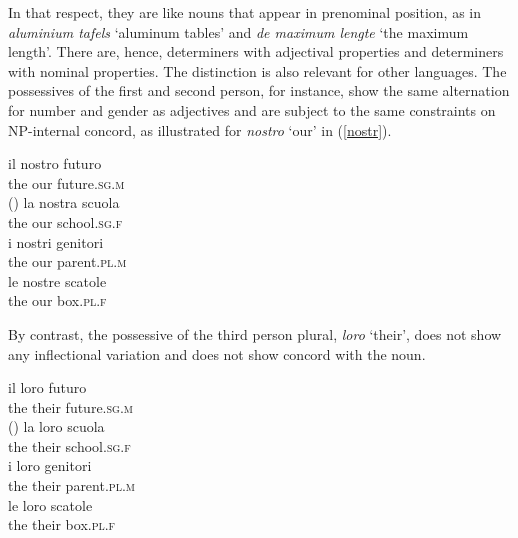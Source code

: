 \documentclass[output=paper,biblatex,babelshorthands,newtxmath,draftmode,colorlinks,citecolor=brown]{langscibook}
\begin{document}
\noindent
In that respect, they are like nouns that appear in prenominal position,
as in \emph{aluminium tafels} `aluminum tables' and \emph{de maximum lengte}
`the maximum length'. There are, hence, determiners with adjectival 
properties and determiners with nominal properties.   
The distinction is also relevant for other languages. The  
possessives of the first and second person, for instance, 
show the same alternation for number and gender as adjectives
and are subject to the same constraints on NP-internal concord, as illustrated 
for \emph{nostro} `our' in (\ref{nostr}). 

\begin{exe}  
\ex\label{nostr} 
\begin{xlist}
\ex 
\gll  il nostro futuro \\
      the our future.\textsc{sg.m} \\\hfill() 
\ex 
\gll  la nostra scuola  \\
      the our school.\textsc{sg.f} \\ 
\ex 
\gll  i nostri genitori \\
      the our parent.\textsc{pl.m} \\ 
\ex 
\gll  le nostre scatole \\
      the our box.\textsc{pl.f} \\ 
\end{xlist}
\end{exe} 

\noindent
By contrast, the possessive of the third person plural, \emph{loro} `their',
does not show any inflectional variation and does not show concord with the noun.

\begin{exe} 
\ex 
\begin{xlist}
\ex 
\gll  il loro futuro \\   
      the their future.\textsc{sg.m}  \\\hfill() 
\ex 
\gll  la loro scuola  \\   
      the their school.\textsc{sg.f}   \\ 
\ex 
\gll  i loro genitori \\   
      the their parent.\textsc{pl.m} \\ 
\ex 
\gll  le loro scatole \\   
      the their box.\textsc{pl.f} \\ 
\end{xlist} 
\end{exe}
\end{document}
